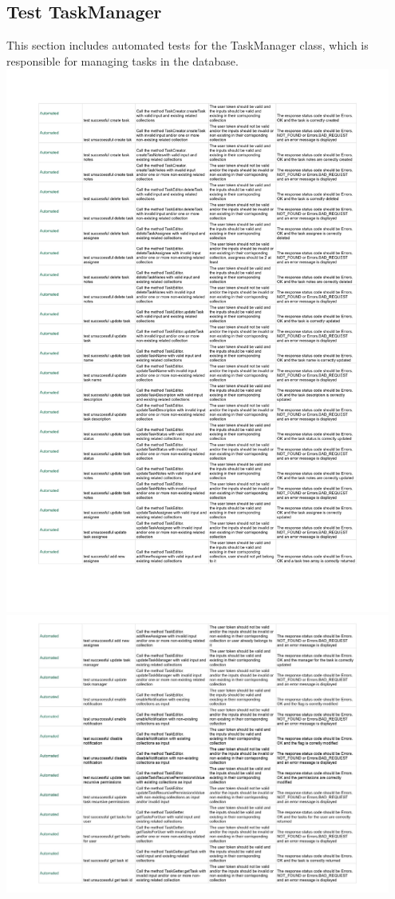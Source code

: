 \documentclass{article}
\begin{document}
\subsection*{Test TaskManager}
This section includes automated tests for the TaskManager class, which is responsible for managing tasks in the database.
\newline
\includegraphics[width=0.95\textwidth]{images/Test_TaskManager-immagini-0.jpg}
\newline
\includegraphics[width=0.95\textwidth]{images/Test_TaskManager-immagini-1.jpg}
\end{document}
